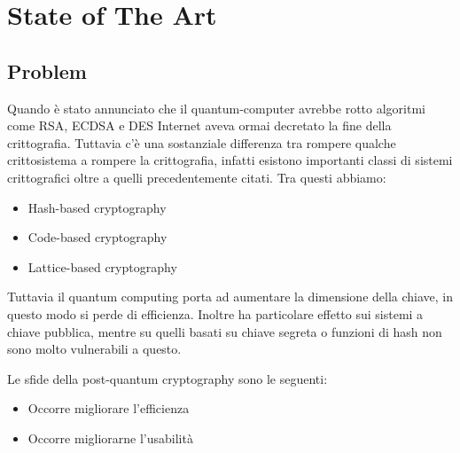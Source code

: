 
\chapter{State of The Art} 

\label{Chapter1}  


\newcommand{\keyword}[1]{\textbf{#1}}
\newcommand{\tabhead}[1]{\textbf{#1}}
\newcommand{\code}[1]{\texttt{#1}}
\newcommand{\file}[1]{\texttt{\bfseries#1}}
\newcommand{\option}[1]{\texttt{\itshape#1}}


\section{Problem}

Quando è stato annunciato che il quantum-computer avrebbe rotto algoritmi come RSA, ECDSA e DES Internet aveva ormai decretato la fine della crittografia.
Tuttavia c'è una sostanziale differenza tra rompere qualche crittosistema a rompere la crittografia, infatti esistono importanti classi di sistemi crittografici
oltre a quelli precedentemente citati. Tra questi abbiamo:

\begin{itemize}
	\item Hash-based cryptography
	\item Code-based cryptography
	\item Lattice-based cryptography
\end{itemize}

Tuttavia il quantum computing porta ad aumentare la dimensione della chiave, in questo modo si perde di efficienza. Inoltre ha particolare effetto sui sistemi a chiave
pubblica, mentre su quelli basati su chiave segreta o funzioni di hash non sono molto vulnerabili a questo.

Le sfide della post-quantum cryptography sono le seguenti:

\begin{itemize}
	\item Occorre migliorare l'efficienza 
	\item Occorre migliorarne l'usabilità
\end{itemize}

